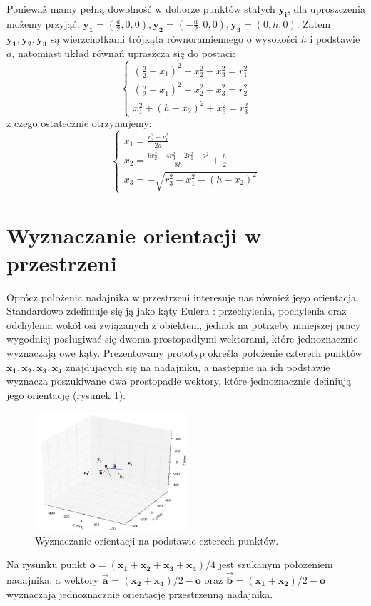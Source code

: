 Ponieważ mamy pełną dowolność w doborze punktów stałych $\boldsymbol{y_i}$, dla uproszczenia możemy przyjąć:
$\boldsymbol{y_1}=(\frac{a}{2},0,0), \boldsymbol{y_2}=(-\frac{a}{2},0,0), \boldsymbol{y_3}=(0,h,0)$. 
Zatem $\boldsymbol{y_1}, \boldsymbol{y_2}, \boldsymbol{y_3}$ są wierzchołkami
trójkąta równoramiennego o wysokości $h$ i podstawie $a$, natomiast układ równań upraszcza
się do postaci:
\[
 \begin{cases}
     (\frac{a}{2}-x_1)^2 + x_2^2 + x_3^2 = r_1^2
 \\  (\frac{a}{2}+x_1)^2 + x_2^2 + x_3^2 = r_2^2
 \\  x_1^2 + (h-x_2)^2 + x_3^2 = r_3^2
 \end{cases}
\]
z czego ostatecznie otrzymujemy:
\[
 \begin{cases}
     x_1 = \frac{r_2^2 - r_1^2}{2a}
 \\  x_2 = \frac{6r_2^2 - 4r_3^2 - 2r_1^2 + a^2}{8h}  + \frac{h}{2}
 \\  x_3 = \pm \sqrt{r_3^2-x_1^2-(h-x_2)^2}
 \end{cases}
\]


\section{Wyznaczanie orientacji w przestrzeni}

Oprócz położenia nadajnika w przestrzeni interesuje nas również jego orientacja.
Standardowo zdefiniuje się ją jako kąty Eulera \cite{bib:katyEulera}: przechylenia, 
pochylenia oraz odchylenia wokół osi związanych z obiektem, jednak na potrzeby niniejszej pracy wygodniej 
posługiwać się dwoma prostopadłymi wektorami, które jednoznacznie wyznaczają owe kąty. 
Prezentowany prototyp określa położenie czterech punktów $\boldsymbol{x_1, x_2, x_3, x_4}$ znajdujących się
na nadajniku, a następnie na ich podstawie wyznacza poszukiwane dwa prostopadłe wektory, które jednoznacznie
definiują jego orientację (rysunek \ref{fig:orientacja}).
 \begin{figure}[H]
    \centering
    \includegraphics[width=0.5\textwidth, trim= 0mm 0mm 0mm 0mm,clip]{orientacja}
    \caption{Wyznaczanie orientacji na podstawie czterech punktów.}
    \label{fig:orientacja}
\end{figure}
Na rysunku punkt $\boldsymbol{o} = (\boldsymbol{x_1} + \boldsymbol{x_2} + \boldsymbol{x_3} + \boldsymbol{x_4})/4$ jest szukanym położeniem
nadajnika, a wektory $\boldsymbol{\overrightarrow{a}} = (\boldsymbol{x_2} + \boldsymbol{x_4})/2 - \boldsymbol{o}$ oraz 
$\boldsymbol{\overrightarrow{b}} = (\boldsymbol{x_1} + \boldsymbol{x_2})/2 - \boldsymbol{o}$ wyznaczają jednoznacznie
orientację przestrzenną nadajnika.


